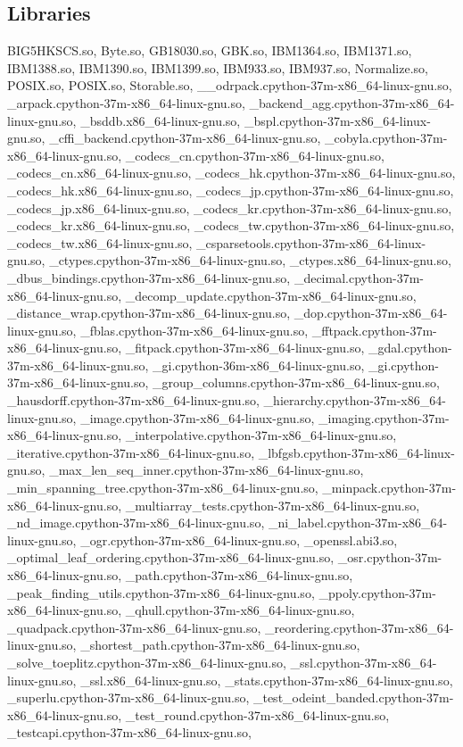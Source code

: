 \documentclass[
    12pt,                               %
    DIV=14,                     %
    parskip=half+,              %
    bigheadings,                %
    cleardoubleempty,   %
    halfparskip,                %
    ]{scrreprt} %
\begin{document}
\begin{appendices}
\section{Libraries}
\begin{sloppypar}
{\scriptsize
BIG5HKSCS.so, Byte.so, GB18030.so, GBK.so, IBM1364.so, IBM1371.so, IBM1388.so, IBM1390.so, IBM1399.so, IBM933.so, IBM937.so, Normalize.so, POSIX.so, POSIX.so, Storable.so, \_\_odrpack.cpython-37m-x86\_64-linux-gnu.so, \_arpack.cpython-37m-x86\_64-linux-gnu.so, \_backend\_agg.cpython-37m-x86\_64-linux-gnu.so, \_bsddb.x86\_64-linux-gnu.so, \_bspl.cpython-37m-x86\_64-linux-gnu.so, \_cffi\_backend.cpython-37m-x86\_64-linux-gnu.so, \_cobyla.cpython-37m-x86\_64-linux-gnu.so, \_codecs\_cn.cpython-37m-x86\_64-linux-gnu.so, \_codecs\_cn.x86\_64-linux-gnu.so, \_codecs\_hk.cpython-37m-x86\_64-linux-gnu.so, \_codecs\_hk.x86\_64-linux-gnu.so, \_codecs\_jp.cpython-37m-x86\_64-linux-gnu.so, \_codecs\_jp.x86\_64-linux-gnu.so, \_codecs\_kr.cpython-37m-x86\_64-linux-gnu.so, \_codecs\_kr.x86\_64-linux-gnu.so, \_codecs\_tw.cpython-37m-x86\_64-linux-gnu.so, \_codecs\_tw.x86\_64-linux-gnu.so, \_csparsetools.cpython-37m-x86\_64-linux-gnu.so, \_ctypes.cpython-37m-x86\_64-linux-gnu.so, \_ctypes.x86\_64-linux-gnu.so, \_dbus\_bindings.cpython-37m-x86\_64-linux-gnu.so, \_decimal.cpython-37m-x86\_64-linux-gnu.so, \_decomp\_update.cpython-37m-x86\_64-linux-gnu.so, \_distance\_wrap.cpython-37m-x86\_64-linux-gnu.so, \_dop.cpython-37m-x86\_64-linux-gnu.so, \_fblas.cpython-37m-x86\_64-linux-gnu.so, \_fftpack.cpython-37m-x86\_64-linux-gnu.so, \_fitpack.cpython-37m-x86\_64-linux-gnu.so, \_gdal.cpython-37m-x86\_64-linux-gnu.so, \_gi.cpython-36m-x86\_64-linux-gnu.so, \_gi.cpython-37m-x86\_64-linux-gnu.so, \_group\_columns.cpython-37m-x86\_64-linux-gnu.so, \_hausdorff.cpython-37m-x86\_64-linux-gnu.so, \_hierarchy.cpython-37m-x86\_64-linux-gnu.so, \_image.cpython-37m-x86\_64-linux-gnu.so, \_imaging.cpython-37m-x86\_64-linux-gnu.so, \_interpolative.cpython-37m-x86\_64-linux-gnu.so, \_iterative.cpython-37m-x86\_64-linux-gnu.so, \_lbfgsb.cpython-37m-x86\_64-linux-gnu.so, \_max\_len\_seq\_inner.cpython-37m-x86\_64-linux-gnu.so, \_min\_spanning\_tree.cpython-37m-x86\_64-linux-gnu.so, \_minpack.cpython-37m-x86\_64-linux-gnu.so, \_multiarray\_tests.cpython-37m-x86\_64-linux-gnu.so, \_nd\_image.cpython-37m-x86\_64-linux-gnu.so, \_ni\_label.cpython-37m-x86\_64-linux-gnu.so, \_ogr.cpython-37m-x86\_64-linux-gnu.so, \_openssl.abi3.so, \_optimal\_leaf\_ordering.cpython-37m-x86\_64-linux-gnu.so, \_osr.cpython-37m-x86\_64-linux-gnu.so, \_path.cpython-37m-x86\_64-linux-gnu.so, \_peak\_finding\_utils.cpython-37m-x86\_64-linux-gnu.so, \_ppoly.cpython-37m-x86\_64-linux-gnu.so, \_qhull.cpython-37m-x86\_64-linux-gnu.so, \_quadpack.cpython-37m-x86\_64-linux-gnu.so, \_reordering.cpython-37m-x86\_64-linux-gnu.so, \_shortest\_path.cpython-37m-x86\_64-linux-gnu.so, \_solve\_toeplitz.cpython-37m-x86\_64-linux-gnu.so, \_ssl.cpython-37m-x86\_64-linux-gnu.so, \_ssl.x86\_64-linux-gnu.so, \_stats.cpython-37m-x86\_64-linux-gnu.so, \_superlu.cpython-37m-x86\_64-linux-gnu.so, \_test\_odeint\_banded.cpython-37m-x86\_64-linux-gnu.so, \_test\_round.cpython-37m-x86\_64-linux-gnu.so, \_testcapi.cpython-37m-x86\_64-linux-gnu.so, }
\end{sloppypar}
\end{appendices}
\end{document}
